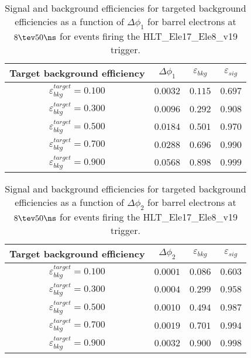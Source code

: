 \clearpage

\begin{table}[!bht]
  \begin{center}
    \begin{tabular}{cccc}
      \hline
      Target background efficiency & $\Delta\phi_1$ & $\varepsilon_{bkg}$ & $\varepsilon_{sig}$ \\ 
      \hline
      $\varepsilon_{bkg}^{target} = 0.100$ & $  0.0032$ & $0.115$ & $0.697$ \\
      $\varepsilon_{bkg}^{target} = 0.300$ & $  0.0096$ & $0.292$ & $0.908$ \\
      $\varepsilon_{bkg}^{target} = 0.500$ & $  0.0184$ & $0.501$ & $0.970$ \\
      $\varepsilon_{bkg}^{target} = 0.700$ & $  0.0288$ & $0.696$ & $0.990$ \\
      $\varepsilon_{bkg}^{target} = 0.900$ & $  0.0568$ & $0.898$ & $0.999$ \\
      \hline
    \end{tabular}
    \caption{Signal and background efficiencies for targeted background efficiencies as a function of $\Delta\phi_1$ for barrel electrons at $8\tev 50\ns$ for events firing the HLT\_Ele17\_Ele8\_v19 trigger.}
    \label{tab:eff_rej_phi1_beam_8_50_trigger_17_8_B}
  \end{center}
\end{table}

\clearpage

\begin{table}[!bht]
  \begin{center}
    \begin{tabular}{cccc}
      \hline
      Target background efficiency & $\Delta\phi_2$ & $\varepsilon_{bkg}$ & $\varepsilon_{sig}$ \\ 
      \hline
      $\varepsilon_{bkg}^{target} = 0.100$ & $  0.0001$ & $0.086$ & $0.603$ \\
      $\varepsilon_{bkg}^{target} = 0.300$ & $  0.0004$ & $0.299$ & $0.958$ \\
      $\varepsilon_{bkg}^{target} = 0.500$ & $  0.0010$ & $0.494$ & $0.987$ \\
      $\varepsilon_{bkg}^{target} = 0.700$ & $  0.0019$ & $0.701$ & $0.994$ \\
      $\varepsilon_{bkg}^{target} = 0.900$ & $  0.0032$ & $0.900$ & $0.998$ \\
      \hline
    \end{tabular}
    \caption{Signal and background efficiencies for targeted background efficiencies as a function of $\Delta\phi_2$ for barrel electrons at $8\tev 50\ns$ for events firing the HLT\_Ele17\_Ele8\_v19 trigger.}
    \label{tab:eff_rej_phi2_beam_8_50_trigger_17_8_B}
  \end{center}
\end{table}

